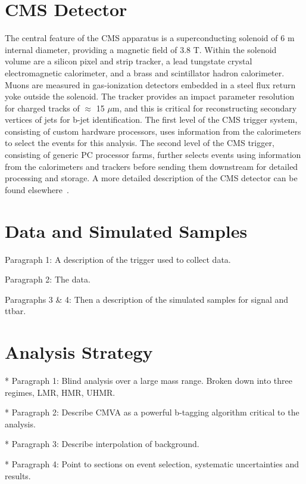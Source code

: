 \documentclass[aps,prd,reprint,superscriptaddress,nofootinbib,showpacs,floatfix]{revtex4-1}
\begin{document}
\section{CMS Detector}

The central feature of the CMS apparatus is a superconducting solenoid of 6 m internal diameter, providing a magnetic field of 3.8 T. Within the solenoid volume are a silicon pixel and strip tracker, a lead tungstate crystal electromagnetic calorimeter, and a brass and scintillator hadron calorimeter. Muons are measured in gas-ionization detectors embedded in a steel flux return yoke outside the solenoid. The tracker provides an impact parameter resolution for charged tracks of $\approx$ 15 $\mu$m, and this is critical for reconstructing secondary vertices of jets for b-jet identification. The first level of the CMS trigger system, consisting of custom hardware processors, uses information from the calorimeters to select the events for this analysis. The second level of the CMS trigger, consisting of generic PC processor farms, further selects events using information from the calorimeters and trackers before sending them downstream for detailed processing and storage. A more detailed description of the CMS detector can be found elsewhere~\cite{Chatrchyan:2008aa}.

\section{Data and Simulated Samples}

Paragraph 1: A description of the trigger used to collect data. 

Paragraph 2: The data.

Paragraphs 3 \& 4: Then a description of the simulated samples for signal and ttbar.

\section{Analysis Strategy}

* Paragraph 1: Blind analysis over a large mass range. Broken down into three regimes, LMR, HMR, UHMR.

* Paragraph 2: Describe CMVA as a powerful b-tagging algorithm critical to the analysis.

* Paragraph 3: Describe interpolation of background.

* Paragraph 4: Point to sections on event selection, systematic uncertainties and results. 
\end{document}
